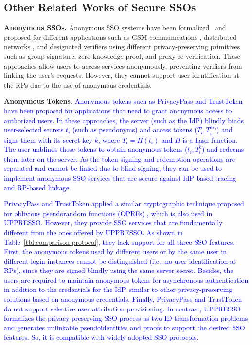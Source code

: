 \subsection{Other Related Works of Secure SSOs}
\label{sec:related}

\noindent\textbf{Anonymous SSOs.} Anonymous SSO systems have been formalized~\cite{WangWS13} and proposed for different applications such as GSM communications \cite{ElmuftiWRR08}, distributed networks \cite{WangWS13}, and designated verifiers \cite{HanCSTW18, HanCSTWW20} using different privacy-preserving primitives such as group signature, zero-knowledge proof, and proxy re-verification. These approaches allow users to access services anonymously, preventing verifiers from linking the user's requests. However, they cannot support user identification at the RPs due to the use of anonymous credentials.

%
\noindent\textbf{Anonymous Tokens.}
\textcolor{blue}{Anonymous tokens such as PrivacyPass and TrustToken \cite{privacypass, trusttoken} have been proposed for applications that need to grant anonymous access to authorized users. In these approaches, the server (such as the IdP) blindly binds user-selected secrets $t_i$ (such as pseudonyms) and access tokens ($T_i, T_i^{k{r_i}}$) and signs them with its secret key $k$, where $T_i=H(t_i)$ and $H$ is a hash function. The user unblinds these tokens to obtain anonymous tokens ($t_i, T_i^k$) and redeems them later on the server. As the token signing and redemption operations are separated and cannot be linked due to blind signing, they can be used to implement anonymous SSO services that are secure against IdP-based tracing and RP-based linkage.
}

\textcolor{blue}{PrivacyPass and TrustToken applied a similar cryptographic technique proposed for oblivious pseudorandom functions (OPRFs) \cite{oprf-proved}, which is also used in UPPRESSO. However, they provide SSO services that are fundamentally different from the ones offered by UPPRESSO. As shown in Table~\ref{tbl:comparison-protocol}, they lack support for all three SSO features. First, the anonymous tokens used by different users or by the same user in different login instances cannot be distinguished (i.e., no user identification at RPs), since they are signed blindly using the same server secret. Besides, the users are required to maintain anonymous tokens for asynchronous authentication in addition to the credentials for the IdP, similar to other privacy-preserving solutions based on anonymous credentials. Finally, PrivacyPass and TrustToken do not support selective user attribution provisioning. In contrast, UPPRESSO formalizes the privacy-preserving SSO process as two ID-transformation problems and generates unlinkable pseudoidentities and proofs to support the desired SSO features. So, it is compatible with widely-adopted SSO protocols.
}

